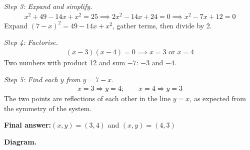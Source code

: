 \documentclass[11pt]{article}
\begin{document}
\textit{Step 3: Expand and simplify.}
\[\begin{gathered}
x^2 + 49 - 14x + x^2 = 25 \implies 2x^2 - 14x + 24 = 0 \implies x^2 - 7x + 12 = 0
\end{gathered}\]
Expand \( (7-x)^2 = 49 - 14x + x^2 \), gather terms, then divide by 2.

\textit{Step 4: Factorise.}
\[\begin{gathered}
(x - 3)(x - 4) = 0 \implies x = 3 \text{ or } x = 4
\end{gathered}\]
Two numbers with product 12 and sum \( -7 \): \( -3 \) and \( -4 \).

\textit{Step 5: Find each \( y \) from \( y = 7 - x \).}
\[\begin{gathered}
x = 3 \Rightarrow y = 4; \qquad x = 4 \Rightarrow y = 3
\end{gathered}\]
The two points are reflections of each other in the line \( y = x \), as expected from the symmetry of the system.

\begin{answerbox}
\textbf{Final answer:}\quad \(\displaystyle (x, y) = (3, 4)\) and \(\displaystyle (x, y) = (4, 3)\)
\end{answerbox}
\textbf{Diagram.}
\end{document}

